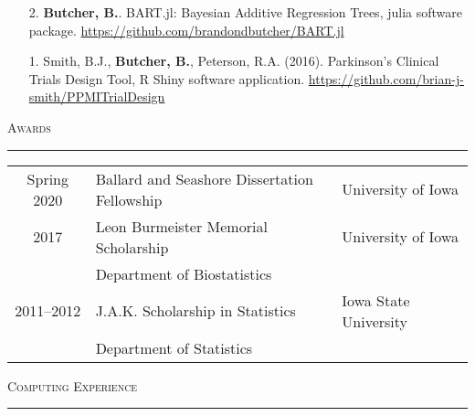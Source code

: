 \documentclass[a4paper]{article}
\begin{document}
\begin{enumerate}
  \item[2.] \textbf{Butcher, B.}. BART.jl: Bayesian
    Additive Regression Trees, julia software package.
    \url{https://github.com/brandondbutcher/BART.jl}
  \item[1.] Smith, B.J., \textbf{Butcher, B.}, Peterson, R.A. (2016).
    Parkinson's Clinical Trials Design Tool, R Shiny software application.
    \url{https://github.com/brian-j-smith/PPMITrialDesign}
\end{enumerate}


\begin{flushleft}
  \Large\textsc{Awards}
  \textcolor{usafagrey}{\rule[0.5\baselineskip]{\textwidth}{0.75pt}}
\end{flushleft}
\vspace{-\baselineskip}

\begin{tabular*}{0.9\textwidth}{@{\extracolsep{\fill}}cll}
  Spring 2020 & Ballard and Seashore Dissertation Fellowship & University of Iowa \\[3pt]
  2017 & Leon Burmeister Memorial Scholarship & University of Iowa \\
       & Department of Biostatistics & \\[3pt]
  2011--2012 & J.A.K. Scholarship in Statistics & Iowa State University \\
            & Department of Statistics
\end{tabular*}
\vspace{0.25\baselineskip}


\begin{flushleft}
  \Large\textsc{Computing Experience}
  \textcolor{usafagrey}{\rule[0.5\baselineskip]{\textwidth}{0.75pt}}
\end{flushleft}
\vspace{-1.5\baselineskip}
\end{document}
